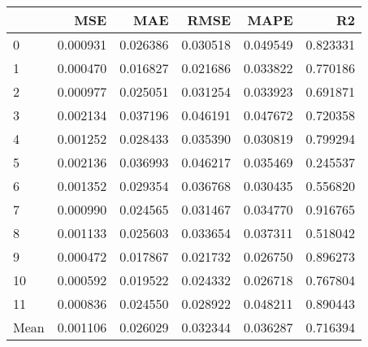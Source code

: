 \begin{tabular}{lrrrrr}
\toprule
 & MSE & MAE & RMSE & MAPE & R2 \\
\midrule
0 & 0.000931 & 0.026386 & 0.030518 & 0.049549 & 0.823331 \\
1 & 0.000470 & 0.016827 & 0.021686 & 0.033822 & 0.770186 \\
2 & 0.000977 & 0.025051 & 0.031254 & 0.033923 & 0.691871 \\
3 & 0.002134 & 0.037196 & 0.046191 & 0.047672 & 0.720358 \\
4 & 0.001252 & 0.028433 & 0.035390 & 0.030819 & 0.799294 \\
5 & 0.002136 & 0.036993 & 0.046217 & 0.035469 & 0.245537 \\
6 & 0.001352 & 0.029354 & 0.036768 & 0.030435 & 0.556820 \\
7 & 0.000990 & 0.024565 & 0.031467 & 0.034770 & 0.916765 \\
8 & 0.001133 & 0.025603 & 0.033654 & 0.037311 & 0.518042 \\
9 & 0.000472 & 0.017867 & 0.021732 & 0.026750 & 0.896273 \\
10 & 0.000592 & 0.019522 & 0.024332 & 0.026718 & 0.767804 \\
11 & 0.000836 & 0.024550 & 0.028922 & 0.048211 & 0.890443 \\
Mean & 0.001106 & 0.026029 & 0.032344 & 0.036287 & 0.716394 \\
\bottomrule
\end{tabular}
